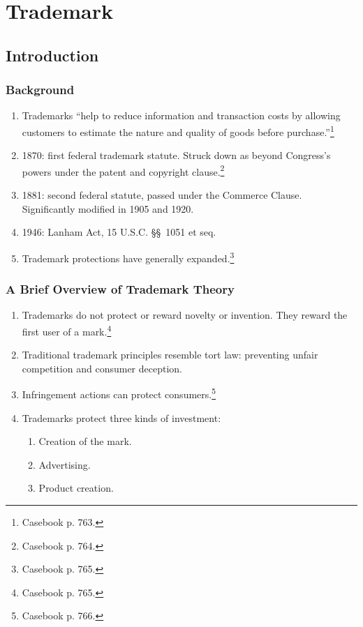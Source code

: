 \section{Trademark}


\subsection{Introduction}

\subsubsection{Background}

\begin{enumerate}
    \item Trademarks ``help to reduce information and transaction costs by 
    allowing customers to estimate the nature and quality of goods before 
    purchase.''\footnote{Casebook p. 763.}
    \item 1870: first federal trademark statute. Struck down as beyond 
    Congress's powers under the patent and copyright clause.\footnote{Casebook 
    p. 764.}
    \item 1881: second federal statute, passed under the Commerce Clause. 
    Significantly modified in 1905 and 1920.
    \item 1946: Lanham Act, 15 U.S.C. \S\S\ 1051 et seq.
    \item Trademark protections have generally expanded.\footnote{Casebook p. 
    765.}
\end{enumerate}

\subsubsection{A Brief Overview of Trademark Theory}

\begin{enumerate}
    \item Trademarks do not protect or reward novelty or invention. They 
    reward the first user of a mark.\footnote{Casebook p. 765.}
    \item Traditional trademark principles resemble tort law: preventing 
    unfair competition and consumer deception.
    \item Infringement actions can protect consumers.\footnote{Casebook p. 
    766.}
    \item Trademarks protect three kinds of investment:
    \begin{enumerate}
        \item Creation of the mark.
        \item Advertising.
        \item Product creation.
    \end{enumerate}
\end{enumerate}

